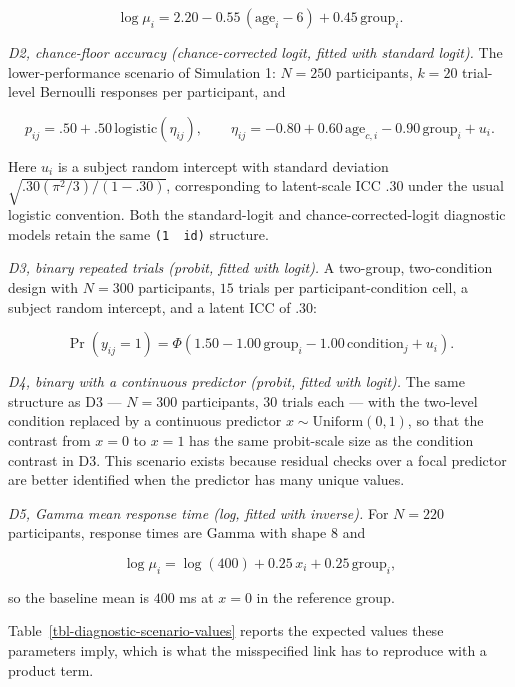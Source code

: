 \documentclass[
  man,
  floatsintext,
  longtable,
  nolmodern,
  notxfonts,
  notimes,
  colorlinks=true,linkcolor=blue,citecolor=blue,urlcolor=blue]{apa7}
\begin{document}
\[
\log \mu_i = 2.20 - 0.55\,(\text{age}_i - 6) + 0.45\,\text{group}_i .
\]

\emph{D2, chance-floor accuracy (chance-corrected logit, fitted with
standard logit).} The lower-performance scenario of Simulation 1:
\(N = 250\) participants, \(k = 20\) trial-level Bernoulli responses per
participant, and

\[
p_{ij} = .50 + .50\,\mathrm{logistic}(\eta_{ij}), \qquad
\eta_{ij} = -0.80 + 0.60\,\text{age}_{c,i} - 0.90\,\text{group}_i + u_i .
\]

Here \(u_i\) is a subject random intercept with standard deviation
\(\sqrt{.30(\pi^2/3)/(1-.30)}\), corresponding to latent-scale ICC
\(.30\) under the usual logistic convention. Both the standard-logit and
chance-corrected-logit diagnostic models retain the same
\texttt{(1\ \textbar{}\ id)} structure.

\emph{D3, binary repeated trials (probit, fitted with logit).} A
two-group, two-condition design with \(N = 300\) participants, \(15\)
trials per participant-condition cell, a subject random intercept, and a
latent ICC of \(.30\):

\[
\Pr(y_{ij} = 1) = \Phi\!\left(1.50 - 1.00\,\text{group}_i - 1.00\,\text{condition}_{j} + u_i\right).
\]

\emph{D4, binary with a continuous predictor (probit, fitted with
logit).} The same structure as D3 --- \(N = 300\) participants, \(30\)
trials each --- with the two-level condition replaced by a continuous
predictor \(x \sim \mathrm{Uniform}(0, 1)\), so that the contrast from
\(x = 0\) to \(x = 1\) has the same probit-scale size as the condition
contrast in D3. This scenario exists because residual checks over a
focal predictor are better identified when the predictor has many unique
values.

\emph{D5, Gamma mean response time (log, fitted with inverse).} For
\(N = 220\) participants, response times are Gamma with shape \(8\) and

\[
\log \mu_i = \log(400) + 0.25\,x_i + 0.25\,\text{group}_i ,
\]

so the baseline mean is \(400\) ms at \(x = 0\) in the reference group.

Table~\ref{tbl-diagnostic-scenario-values} reports the expected values
these parameters imply, which is what the misspecified link has to
reproduce with a product term.
\end{document}
